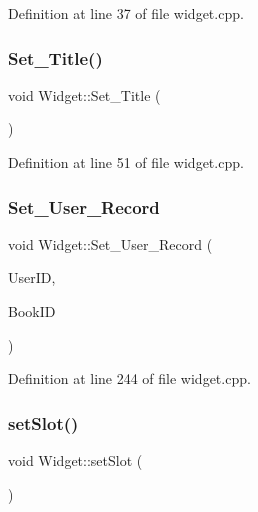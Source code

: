Definition at line 37 of file widget.\+cpp.

\mbox{\label{class_widget_a5323ca5c4124c0d187a2f1398ef48844}} 
\subsubsection{\texorpdfstring{Set\_Title()}{Set\_Title()}}
{\footnotesize\ttfamily void Widget\+::\+Set\+\_\+\+Title (\begin{DoxyParamCaption}{ }\end{DoxyParamCaption})}



Definition at line 51 of file widget.\+cpp.

\mbox{\label{class_widget_a97f2c2eda030b7236e02c5f5e10c8926}} 
\subsubsection{\texorpdfstring{Set\_User\_Record}{Set\_User\_Record}}
{\footnotesize\ttfamily void Widget\+::\+Set\+\_\+\+User\+\_\+\+Record (\begin{DoxyParamCaption}\item[{Q\+String}]{User\+ID,  }\item[{Q\+String}]{Book\+ID }\end{DoxyParamCaption})\hspace{0.3cm}{\ttfamily [slot]}}



Definition at line 244 of file widget.\+cpp.

\mbox{\label{class_widget_ac60c5a62bc3197fbc7ade8f40df70c70}} 
\subsubsection{\texorpdfstring{setSlot()}{setSlot()}}
{\footnotesize\ttfamily void Widget\+::set\+Slot (\begin{DoxyParamCaption}{ }\end{DoxyParamCaption})}




